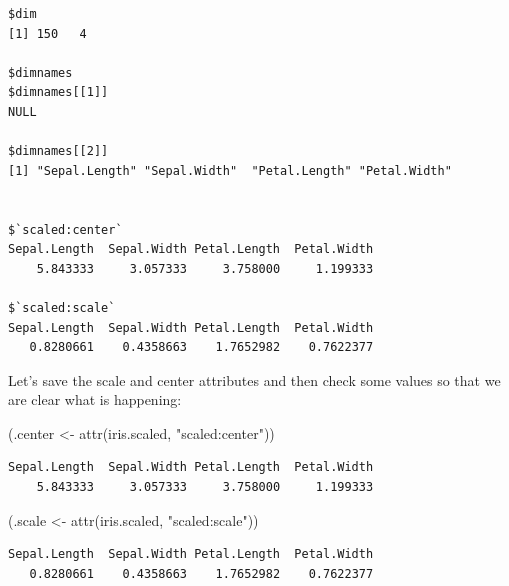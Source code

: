 \documentclass[
]{book}
\newenvironment{Shaded}{\begin{snugshade}}{\end{snugshade}}
\newcommand{\DecValTok}[1]{\textcolor[rgb]{0.00,0.00,0.81}{#1}}
\newcommand{\FunctionTok}[1]{\textcolor[rgb]{0.00,0.00,0.00}{#1}}
\newcommand{\NormalTok}[1]{#1}
\newcommand{\OtherTok}[1]{\textcolor[rgb]{0.56,0.35,0.01}{#1}}
\newcommand{\SpecialCharTok}[1]{\textcolor[rgb]{0.00,0.00,0.00}{#1}}
\newcommand{\StringTok}[1]{\textcolor[rgb]{0.31,0.60,0.02}{#1}}
\begin{document}
\begin{verbatim}
$dim
[1] 150   4

$dimnames
$dimnames[[1]]
NULL

$dimnames[[2]]
[1] "Sepal.Length" "Sepal.Width"  "Petal.Length" "Petal.Width" 


$`scaled:center`
Sepal.Length  Sepal.Width Petal.Length  Petal.Width 
    5.843333     3.057333     3.758000     1.199333 

$`scaled:scale`
Sepal.Length  Sepal.Width Petal.Length  Petal.Width 
   0.8280661    0.4358663    1.7652982    0.7622377 
\end{verbatim}

Let's save the scale and center attributes and then check some values so that we are clear what is happening:

\begin{Shaded}
\begin{Highlighting}[]
\NormalTok{(.center }\OtherTok{\textless{}{-}} \FunctionTok{attr}\NormalTok{(iris.scaled, }\StringTok{"scaled:center"}\NormalTok{))}
\end{Highlighting}
\end{Shaded}

\begin{verbatim}
Sepal.Length  Sepal.Width Petal.Length  Petal.Width 
    5.843333     3.057333     3.758000     1.199333 
\end{verbatim}

\begin{Shaded}
\begin{Highlighting}[]
\NormalTok{(.scale }\OtherTok{\textless{}{-}} \FunctionTok{attr}\NormalTok{(iris.scaled, }\StringTok{"scaled:scale"}\NormalTok{))}
\end{Highlighting}
\end{Shaded}

\begin{verbatim}
Sepal.Length  Sepal.Width Petal.Length  Petal.Width 
   0.8280661    0.4358663    1.7652982    0.7622377 
\end{verbatim}

\begin{Shaded}
\end{Shaded}
\end{document}

